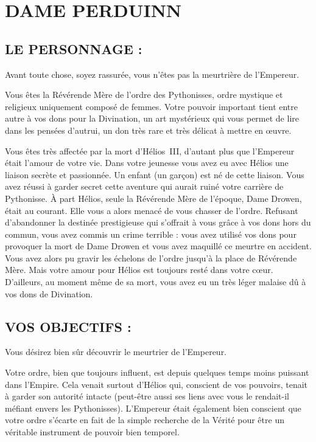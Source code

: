 \documentclass[14pt,twocolumn]{extarticle}
\begin{document}
\section{DAME PERDUINN}

\subsection{LE PERSONNAGE :}

Avant toute chose, soyez rassurée, vous n'êtes pas la meurtrière de l'Empereur.

Vous êtes la Révérende Mère de l'ordre des Pythonisses, ordre mystique et
religieux uniquement composé de femmes. Votre pouvoir important tient entre
autre à vos dons pour la Divination, un art mystérieux qui vous permet de lire
dans les pensées d'autrui, un don très rare et très délicat à mettre en œuvre.

Vous êtes très affectée par la mort d'Hélios~III, d'autant plus que l'Empereur
était l'amour de votre vie. Dans votre jeunesse vous avez eu avec Hélios une
liaison secrète et passionnée. Un enfant (un garçon) est né de cette liaison.
Vous avez réussi à garder secret cette aventure qui aurait ruiné votre carrière
de Pythonisse. À part Hélios, seule la Révérende Mère de l'époque, Dame Drowen,
était au courant. Elle vous a alors menacé de vous chasser de l'ordre. Refusant
d'abandonner la destinée prestigieuse qui s'offrait à vous grâce à vos dons
hors du commun, vous avez commis un crime terrible : vous avez utilisé vos dons
pour provoquer la mort de Dame Drowen et vous avez maquillé ce meurtre en
accident. Vous avez alors pu gravir les échelons de l'ordre jusqu'à la place de
Révérende Mère. Mais votre amour pour Hélios est toujours resté dans votre
cœur. D'ailleurs, au moment même de sa mort, vous avez eu un très léger malaise
dû à vos dons de Divination.

\subsection{VOS OBJECTIFS :}

Vous désirez bien sûr découvrir le meurtrier de l'Empereur.

Votre ordre, bien que toujours influent, est depuis quelques temps moins
puissant dans l'Empire. Cela venait surtout d'Hélios qui, conscient de vos
pouvoirs, tenait à garder son autorité intacte (peut-être aussi ses liens avec
vous le rendait-il méfiant envers les Pythonisses). L'Empereur était également
bien conscient que votre ordre s'écarte en fait de la simple recherche de la
Vérité pour être un véritable instrument de pouvoir bien temporel.
\end{document}
